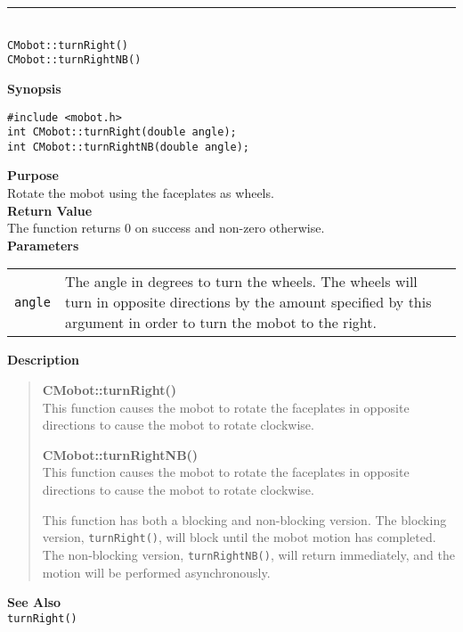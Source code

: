 \noindent
\vspace{5pt}
\rule{4.5in}{0.015in}\\
\noindent
{\LARGE \texttt{CMobot::turnRight()}}\\
{\LARGE \texttt{CMobot::turnRightNB()}}\\
{}

\noindent
{\bf Synopsis}
\vspace{-8pt}
\begin{verbatim}
#include <mobot.h>
int CMobot::turnRight(double angle);
int CMobot::turnRightNB(double angle);
\end{verbatim}

\noindent
{\bf Purpose}\\
Rotate the mobot using the faceplates as wheels.\\

\noindent
{\bf Return Value}\\
The function returns 0 on success and non-zero otherwise.\\

\noindent
{\bf Parameters}\\
\vspace{-0.1in}
\begin{description}
\item               
\begin{tabular}{p{10 mm}p{145 mm}}
\texttt{angle} & The angle in degrees to turn the wheels. The wheels will turn in opposite directions by the amount specified by this argument in order to turn the mobot to the right. \\
\end{tabular}
\end{description}

\noindent
{\bf Description}\\
\vspace{-12pt}
\begin{quote}
{\bf CMobot::turnRight()}\\
This function causes the mobot to rotate the faceplates in opposite directions
to cause the mobot to rotate clockwise.

{\bf CMobot::turnRightNB()}\\
This function causes the mobot to rotate the faceplates in opposite directions
to cause the mobot to rotate clockwise.

This function has both a blocking and non-blocking version.
The blocking version, \texttt{turnRight()}, will block until the
mobot motion has completed. The non-blocking version, \texttt{turnRightNB()},
will return immediately, and the motion will be performed asynchronously.\\
\end{quote}


\noindent
{\bf See Also}\\
\texttt{turnRight()}

